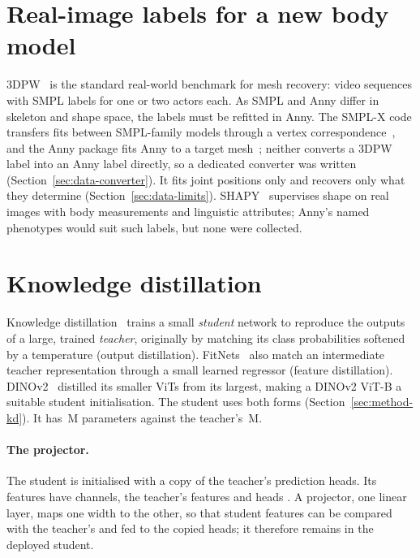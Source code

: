 \section{Real-image labels for a new body model}
\label{sec:bg-labels}

3DPW~\cite{vonmarcard2018_3dpw} is the standard real-world benchmark for mesh recovery: \BgThreeDPWSequences{} video
sequences with SMPL labels for one or two actors each. As SMPL and Anny differ in skeleton and shape space, the labels
must be refitted in Anny. The SMPL-X code transfers fits between SMPL-family models through a vertex
correspondence~\cite{pavlakos2019smplx}, and the Anny package fits Anny to a target mesh~\cite{naver2025annycode};
neither converts a 3DPW label into an Anny label directly, so a dedicated converter was written
(Section~\ref{sec:data-converter}). It fits joint positions only and recovers only what they determine
(Section~\ref{sec:data-limits}). SHAPY~\cite{choutas2022shapy} supervises shape on real images with body measurements
and linguistic attributes; Anny's named phenotypes would suit such labels, but none were collected.

\section{Knowledge distillation}
\label{sec:bg-kd}

Knowledge distillation~\cite{hinton2015distilling} trains a small \emph{student} network to reproduce the outputs of a
large, trained \emph{teacher}, originally by matching its class probabilities softened by a temperature (output
distillation). FitNets~\cite{romero2015fitnets} also match an intermediate teacher representation through a small
learned regressor (feature distillation). DINOv2~\cite{oquab2023dinov2} distilled its smaller ViTs from its largest,
making a DINOv2 ViT-B a suitable student initialisation. The student uses both forms (Section~\ref{sec:method-kd}).
It has \BgStudentParams\,M parameters against the teacher's \BgFinalParams\,M.

\paragraph{The projector.}
The student is initialised with a copy of the teacher's prediction heads. Its features have \BgProjIn{} channels,
the teacher's features and heads \BgProjOut. A projector, one linear layer, maps one width to the other, so that student
features can be compared with the teacher's and fed to the copied heads; it therefore remains in the deployed student.

